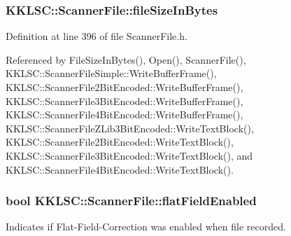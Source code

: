 \subsubsection[{\texorpdfstring{file\+Size\+In\+Bytes}{fileSizeInBytes}}]{ K\+K\+L\+S\+C\+::\+Scanner\+File\+::file\+Size\+In\+Bytes\hspace{0.3cm}{\ttfamily [protected]}}\hypertarget{class_k_k_l_s_c_1_1_scanner_file_aa630f7e950cfd1cd6ecaa901f410728a}{}\label{class_k_k_l_s_c_1_1_scanner_file_aa630f7e950cfd1cd6ecaa901f410728a}


Definition at line 396 of file Scanner\+File.\+h.



Referenced by File\+Size\+In\+Bytes(), Open(), Scanner\+File(), K\+K\+L\+S\+C\+::\+Scanner\+File\+Simple\+::\+Write\+Buffer\+Frame(), K\+K\+L\+S\+C\+::\+Scanner\+File2\+Bit\+Encoded\+::\+Write\+Buffer\+Frame(), K\+K\+L\+S\+C\+::\+Scanner\+File3\+Bit\+Encoded\+::\+Write\+Buffer\+Frame(), K\+K\+L\+S\+C\+::\+Scanner\+File4\+Bit\+Encoded\+::\+Write\+Buffer\+Frame(), K\+K\+L\+S\+C\+::\+Scanner\+File\+Z\+Lib3\+Bit\+Encoded\+::\+Write\+Text\+Block(), K\+K\+L\+S\+C\+::\+Scanner\+File2\+Bit\+Encoded\+::\+Write\+Text\+Block(), K\+K\+L\+S\+C\+::\+Scanner\+File3\+Bit\+Encoded\+::\+Write\+Text\+Block(), and K\+K\+L\+S\+C\+::\+Scanner\+File4\+Bit\+Encoded\+::\+Write\+Text\+Block().

\subsubsection[{\texorpdfstring{flat\+Field\+Enabled}{flatFieldEnabled}}]{\setlength{\rightskip}{0pt plus 5cm}bool K\+K\+L\+S\+C\+::\+Scanner\+File\+::flat\+Field\+Enabled\hspace{0.3cm}{\ttfamily [protected]}}\hypertarget{class_k_k_l_s_c_1_1_scanner_file_ade90241dba08bbf4901084e6187f9289}{}\label{class_k_k_l_s_c_1_1_scanner_file_ade90241dba08bbf4901084e6187f9289}
Indicates if Flat-\/\+Field-\/\+Correction was enabled when file recorded. 

